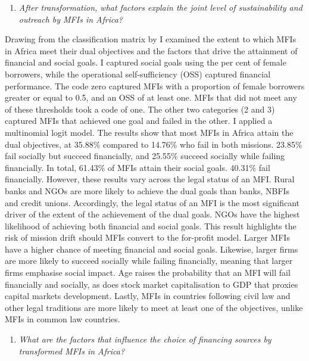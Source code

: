 \documentclass[a4paper, nobind]{templates/ociamthesis}
\providecommand{\tightlist}{%
  \setlength{\itemsep}{0pt}\setlength{\parskip}{0pt}}
\begin{document}
\begin{enumerate}
\def\labelenumi{\arabic{enumi}.}
\setcounter{enumi}{3}
\tightlist
\item
  \emph{After transformation, what factors explain the joint level of sustainability and outreach by MFIs in Africa?}
\end{enumerate}

Drawing from the classification matrix by \textcite{chattopadhyay2017applicability} I examined the extent to which MFIs in Africa meet their dual objectives and the factors that drive the attainment of financial and social goals. I captured social goals using the per cent of female borrowers, while the operational self-sufficiency (OSS) captured financial performance. The code zero captured MFIs with a proportion of female borrowers greater or equal to 0.5, and an OSS of at least one. MFIs that did not meet any of these thresholds took a code of one. The other two categories (2 and 3) captured MFIs that achieved one goal and failed in the other. I applied a multinomial logit model. The results show that most MFIs in Africa attain the dual objectives, at 35.88\% compared to 14.76\% who fail in both missions. 23.85\% fail socially but succeed financially, and 25.55\% succeed socially while failing financially. In total, 61.43\% of MFIs attain their social goals. 40.31\% fail financially. However, these results vary across the legal status of an MFI. Rural banks and NGOs are more likely to achieve the dual goals than banks, NBFIs and credit unions. Accordingly, the legal status of an MFI is the most significant driver of the extent of the achievement of the dual goals. NGOs have the highest likelihood of achieving both financial and social goals. This result highlights the risk of mission drift should MFIs convert to the for-profit model. Larger MFIs have a higher chance of meeting financial and social goals. Likewise, larger firms are more likely to succeed socially while failing financially, meaning that larger firms emphasise social impact. Age raises the probability that an MFI will fail financially and socially, as does stock market capitalisation to GDP that proxies capital markets development. Lastly, MFIs in countries following civil law and other legal traditions are more likely to meet at least one of the objectives, unlike MFIs in common law countries.

\begin{enumerate}
\def\labelenumi{\arabic{enumi}.}
\setcounter{enumi}{4}
\tightlist
\item
  \emph{What are the factors that influence the choice of financing sources by transformed MFIs in Africa?}
\end{enumerate}
\end{document}
